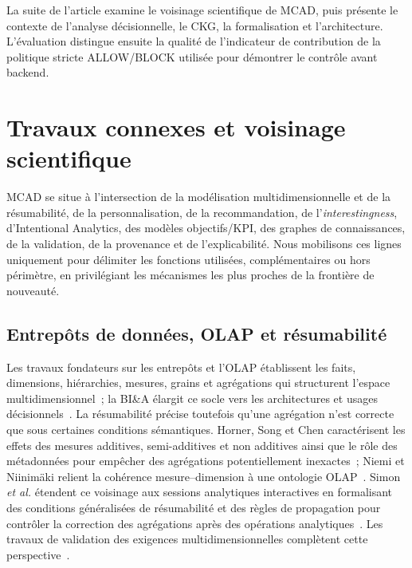 \documentclass[journal]{IEEEtran}
\begin{document}
La suite de l'article examine le voisinage scientifique de MCAD, puis présente le contexte de l'analyse décisionnelle, le CKG, la formalisation et l'architecture. L'évaluation distingue ensuite la qualité de l'indicateur de contribution de la politique stricte ALLOW/BLOCK utilisée pour démontrer le contrôle avant backend.

\section{Travaux connexes et voisinage scientifique}
\label{sec:related}

MCAD se situe à l'intersection de la modélisation multidimensionnelle et de la résumabilité, de la personnalisation, de la recommandation, de l'\emph{interestingness}, d'Intentional Analytics, des modèles objectifs/KPI, des graphes de connaissances, de la validation, de la provenance et de l'explicabilité. Nous mobilisons ces lignes uniquement pour délimiter les fonctions utilisées, complémentaires ou hors périmètre, en privilégiant les mécanismes les plus proches de la frontière de nouveauté.

\subsection{Entrepôts de données, OLAP et résumabilité}

Les travaux fondateurs sur les entrepôts et l'OLAP établissent les faits, dimensions, hiérarchies, mesures, grains et agrégations qui structurent l'espace multidimensionnel~\cite{ChaudhuriDayal97,KimballRoss2013}; la BI\&A élargit ce socle vers les architectures et usages décisionnels~\cite{ChenBI2012}. La résumabilité précise toutefois qu'une agrégation n'est correcte que sous certaines conditions sémantiques. Horner, Song et Chen caractérisent les effets des mesures additives, semi-additives et non additives ainsi que le rôle des métadonnées pour empêcher des agrégations potentiellement inexactes~\cite{HornerSongChen2004}; Niemi et Niinimäki relient la cohérence mesure--dimension à une ontologie OLAP~\cite{NiemiNiinimaki2010}. Simon \emph{et al.} étendent ce voisinage aux sessions analytiques interactives en formalisant des conditions généralisées de résumabilité et des règles de propagation pour contrôler la correction des agrégations après des opérations analytiques~\cite{SimonAmannLiuGancarski2023}. Les travaux de validation des exigences multidimensionnelles complètent cette perspective~\cite{RomeroAbello2010}.
\end{document}
